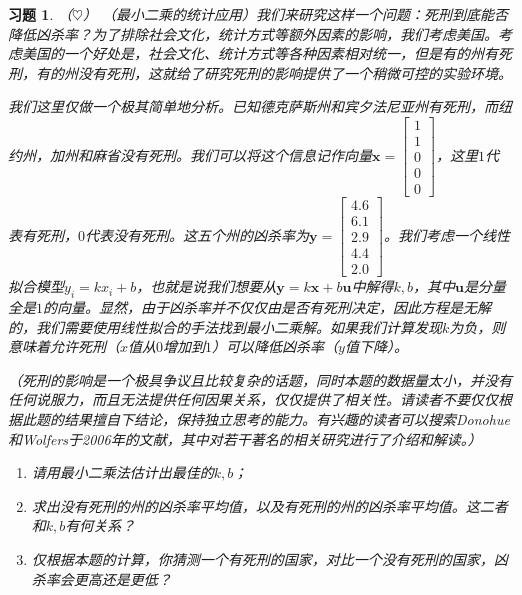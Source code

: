 \documentclass[UTF8]{ctexart}
\newcommand{\bu}{{\bm u}}
\newtheorem{ex}[thm]{习题}
\begin{document}
\begin{ex} （$\heartsuit $）
（最小二乘的统计应用）我们来研究这样一个问题：死刑到底能否降低凶杀率？为了排除社会文化，统计方式等额外因素的影响，我们考虑美国。考虑美国的一个好处是，社会文化、统计方式等各种因素相对统一，但是有的州有死刑，有的州没有死刑，这就给了研究死刑的影响提供了一个稍微可控的实验环境。

我们这里仅做一个极其简单地分析。已知德克萨斯州和宾夕法尼亚州有死刑，而纽约州，加州和麻省没有死刑。我们可以将这个信息记作向量$\bm x=\begin{bmatrix}1\\1\\0\\0\\0\end{bmatrix}$，这里$1$代表有死刑，$0$代表没有死刑。这五个州的凶杀率为$\bm y=\begin{bmatrix}4.6\\6.1\\2.9\\4.4\\2.0\end{bmatrix}$。我们考虑一个线性拟合模型$y_i=kx_i+b$，也就是说我们想要从$\bm y=k\bm x+b\bm u$中解得$k,b$，其中$\bu$是分量全是$1$的向量。显然，由于凶杀率并不仅仅由是否有死刑决定，因此方程是无解的，我们需要使用线性拟合的手法找到最小二乘解。如果我们计算发现$k$为负，则意味着允许死刑（$x$值从$0$增加到$1$）可以降低凶杀率（$y$值下降）。

（死刑的影响是一个极具争议且比较复杂的话题，同时本题的数据量太小，并没有任何说服力，而且无法提供任何因果关系，仅仅提供了相关性。请读者不要仅仅根据此题的结果擅自下结论，保持独立思考的能力。有兴趣的读者可以搜索Donohue和Wolfers于2006年的文献，其中对若干著名的相关研究进行了介绍和解读。）
\begin{enumerate}
\item 请用最小二乘法估计出最佳的$k,b$；
\item 求出没有死刑的州的凶杀率平均值，以及有死刑的州的凶杀率平均值。这二者和$k,b$有何关系？
\item 仅根据本题的计算，你猜测一个有死刑的国家，对比一个没有死刑的国家，凶杀率会更高还是更低？
\end{enumerate}
\end{ex}
\end{document}
